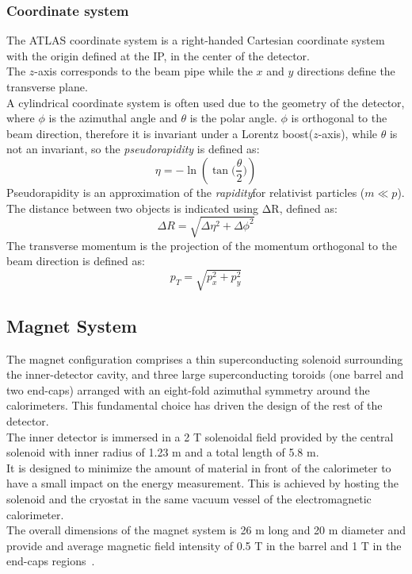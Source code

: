 \subsubsection*{Coordinate system}
The ATLAS coordinate system is a right-handed Cartesian coordinate system with the origin defined at the IP, in the center of the detector.\\
The $z$-axis corresponds to the beam pipe while the $x$ and $y$ directions define the transverse plane.\\
A cylindrical coordinate system is often used due to the geometry of the detector, where $\phi$ is the azimuthal angle and $\theta$ is the polar angle. 
$\phi$ is orthogonal to the beam direction, therefore it is invariant under a Lorentz boost($z$-axis), while $\theta$ is not an invariant, so the \textit{pseudorapidity} is defined as:
\begin{equation}
\eta=-\ln{(\tan{\bigg(\frac{\theta}{2}\bigg)})}
\end{equation}
Pseudorapidity is an approximation of the \textit{rapidity}\footnotemark for relativist particles ($m\ll p$).
\\The distance between two objects is indicated using $\mathrm{\Delta R}$, defined as:
\begin{equation}
\Delta R =\sqrt{\Delta \eta^{2}+\Delta \phi^{2}}
\end{equation}
The transverse momentum is the projection of the momentum orthogonal to the beam direction is defined as:
\begin{equation}
p_{T}=\sqrt{p^{2}_{x}+p^{2}_{y}}
\end{equation}

\subsection{Magnet System}
\label{sec:MagSys}
The magnet configuration comprises a thin superconducting solenoid surrounding the inner-detector cavity, and three large superconducting toroids (one barrel and two end-caps) arranged with an eight-fold azimuthal symmetry around the calorimeters. This fundamental choice has driven the design of the rest of the detector.\\
The inner detector is immersed in a 2 T solenoidal field provided by the central solenoid with inner radius of 1.23 m and a total length of 5.8 m.\\
It is designed to minimize the amount of material in front of the calorimeter to have a small impact on the energy measurement. This is achieved by hosting the solenoid and
the cryostat in the same vacuum vessel of the electromagnetic calorimeter.\\
The overall dimensions of the magnet system is 26 m long and 20 m diameter and provide and average magnetic field intensity of 0.5 T in the barrel and 1 T in the end-caps regions~\cite{MagSys}.

